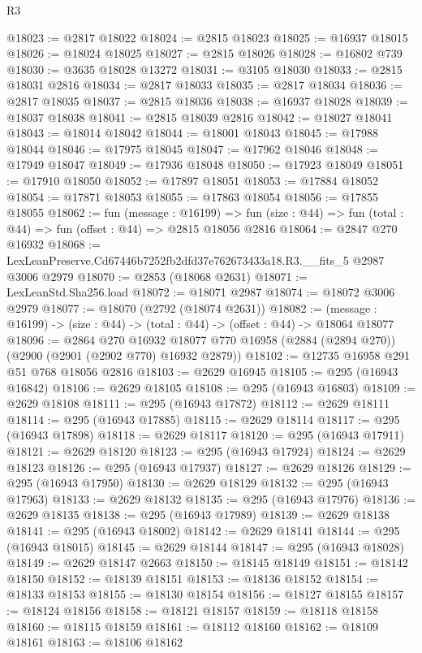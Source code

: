 \begin{lexlean}{R3}
\begin{coremodule}
@18023 := @2817 @18022
@18024 := @2815 @18023
@18025 := @16937 @18015
@18026 := @18024 @18025
@18027 := @2815 @18026
@18028 := @16802 @739
@18030 := @3635 @18028 @13272
@18031 := @3105 @18030
@18033 := @2815 @18031 @2816
@18034 := @2817 @18033
@18035 := @2817 @18034
@18036 := @2817 @18035
@18037 := @2815 @18036
@18038 := @16937 @18028
@18039 := @18037 @18038
@18041 := @2815 @18039 @2816
@18042 := @18027 @18041
@18043 := @18014 @18042
@18044 := @18001 @18043
@18045 := @17988 @18044
@18046 := @17975 @18045
@18047 := @17962 @18046
@18048 := @17949 @18047
@18049 := @17936 @18048
@18050 := @17923 @18049
@18051 := @17910 @18050
@18052 := @17897 @18051
@18053 := @17884 @18052
@18054 := @17871 @18053
@18055 := @17863 @18054
@18056 := @17855 @18055
@18062 := fun (message : @16199) =>
  fun (size : @44) => fun (total : @44) => fun (offset : @44) => @2815 @18056 @2816
@18064 := @2847 @270 @16932
@18068 := LexLeanPreserve.Cd67446b7252fb2dfd37e762673433a18.R3.__fits_5 @2987 @3006 @2979
@18070 := @2853 (@18068 @2631)
@18071 := LexLeanStd.Sha256.load
@18072 := @18071 @2987
@18074 := @18072 @3006 @2979
@18077 := @18070 (@2792 (@18074 @2631))
@18082 := (message : @16199) -> (size : @44) -> (total : @44) -> (offset : @44) -> @18064 @18077
@18096 := @2864
    @270
    @16932
    @18077
    @770
    @16958
    (@2884 (@2894 @270))
    (@2900 (@2901 (@2902 @770) @16932 @2879))
@18102 := @12735 @16958 @291 @51 @768 @18056 @2816
@18103 := @2629 @16945
@18105 := @295 (@16943 @16842)
@18106 := @2629 @18105
@18108 := @295 (@16943 @16803)
@18109 := @2629 @18108
@18111 := @295 (@16943 @17872)
@18112 := @2629 @18111
@18114 := @295 (@16943 @17885)
@18115 := @2629 @18114
@18117 := @295 (@16943 @17898)
@18118 := @2629 @18117
@18120 := @295 (@16943 @17911)
@18121 := @2629 @18120
@18123 := @295 (@16943 @17924)
@18124 := @2629 @18123
@18126 := @295 (@16943 @17937)
@18127 := @2629 @18126
@18129 := @295 (@16943 @17950)
@18130 := @2629 @18129
@18132 := @295 (@16943 @17963)
@18133 := @2629 @18132
@18135 := @295 (@16943 @17976)
@18136 := @2629 @18135
@18138 := @295 (@16943 @17989)
@18139 := @2629 @18138
@18141 := @295 (@16943 @18002)
@18142 := @2629 @18141
@18144 := @295 (@16943 @18015)
@18145 := @2629 @18144
@18147 := @295 (@16943 @18028)
@18149 := @2629 @18147 @2663
@18150 := @18145 @18149
@18151 := @18142 @18150
@18152 := @18139 @18151
@18153 := @18136 @18152
@18154 := @18133 @18153
@18155 := @18130 @18154
@18156 := @18127 @18155
@18157 := @18124 @18156
@18158 := @18121 @18157
@18159 := @18118 @18158
@18160 := @18115 @18159
@18161 := @18112 @18160
@18162 := @18109 @18161
@18163 := @18106 @18162

\end{coremodule}
\end{lexlean}
